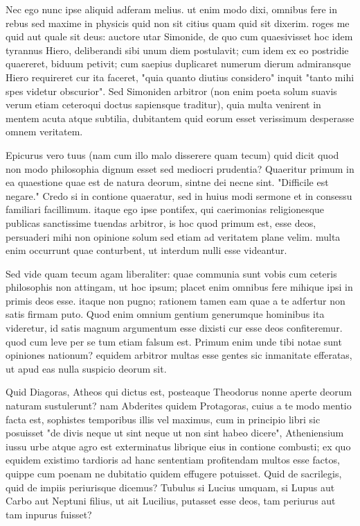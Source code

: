  Nec ego nunc ipse aliquid adferam melius. ut enim modo dixi, omnibus fere in rebus sed maxime in physicis quid non sit citius quam quid sit dixerim. roges me quid aut quale sit deus: auctore utar Simonide, de quo cum quaesivisset hoc idem tyrannus Hiero, deliberandi sibi unum diem postulavit; cum idem ex eo postridie quaereret, biduum petivit; cum saepius duplicaret numerum dierum admiransque Hiero requireret cur ita faceret, "quia quanto diutius considero" inquit "tanto mihi spes videtur obscurior". Sed Simoniden arbitror (non enim poeta solum suavis verum etiam ceteroqui doctus sapiensque traditur), quia multa venirent in mentem acuta atque subtilia, dubitantem quid eorum esset verissimum desperasse omnem veritatem.

 Epicurus vero tuus (nam cum illo malo disserere quam tecum) quid dicit quod non modo philosophia dignum esset sed mediocri prudentia? Quaeritur primum in ea quaestione quae est de natura deorum, sintne dei necne sint. "Difficile est negare." Credo si in contione quaeratur, sed in huius modi sermone et in consessu familiari facillimum. itaque ego ipse pontifex, qui caerimonias religionesque publicas sanctissime tuendas arbitror, is hoc quod primum est, esse deos, persuaderi mihi non opinione solum sed etiam ad veritatem plane velim. multa enim occurrunt quae conturbent, ut interdum nulli esse videantur.

 Sed vide quam tecum agam liberaliter: quae communia sunt vobis cum ceteris philosophis non attingam, ut hoc ipsum; placet enim omnibus fere mihique ipsi in primis deos esse. itaque non pugno; rationem tamen eam quae a te adfertur non satis firmam puto. Quod enim omnium gentium generumque hominibus ita videretur, id satis magnum argumentum esse dixisti cur esse deos confiteremur. quod cum leve per se tum etiam falsum est. Primum enim unde tibi notae sunt opiniones nationum? equidem arbitror multas esse gentes sic inmanitate efferatas, ut apud eas nulla suspicio deorum sit.

 Quid Diagoras, Atheos qui dictus est, posteaque Theodorus nonne aperte deorum naturam sustulerunt? nam Abderites quidem Protagoras, cuius a te modo mentio facta est, sophistes temporibus illis vel maximus, cum in principio libri sic posuisset "de divis neque ut sint neque ut non sint habeo dicere", Atheniensium iussu urbe atque agro est exterminatus librique eius in contione combusti; ex quo equidem existimo tardioris ad hanc sententiam profitendam multos esse factos, quippe cum poenam ne dubitatio quidem effugere potuisset. Quid de sacrilegis, quid de impiis periurisque dicemus? Tubulus si Lucius umquam, si Lupus aut Carbo aut Neptuni filius, ut ait Lucilius, putasset esse deos, tam periurus aut tam inpurus fuisset?

